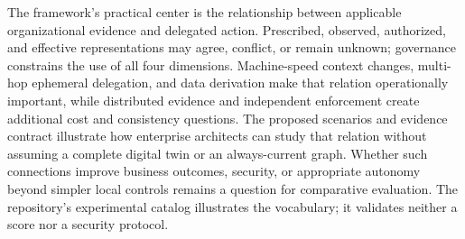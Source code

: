 \documentclass[11pt,letterpaper]{article}
\begin{document}
The framework's practical center is the relationship between applicable organizational evidence and delegated action. Prescribed, observed, authorized, and effective representations may agree, conflict, or remain unknown; governance constrains the use of all four dimensions. Machine-speed context changes, multi-hop ephemeral delegation, and data derivation make that relation operationally important, while distributed evidence and independent enforcement create additional cost and consistency questions. The proposed scenarios and evidence contract illustrate how enterprise architects can study that relation without assuming a complete digital twin or an always-current graph. Whether such connections improve business outcomes, security, or appropriate autonomy beyond simpler local controls remains a question for comparative evaluation. The repository's experimental catalog illustrates the vocabulary; it validates neither a score nor a security protocol.
\end{document}
